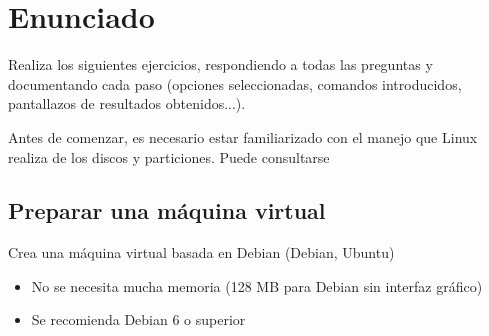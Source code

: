 
\usepackage{eurosym}




\renewcommand{\hmwkTitle}{Práctica RAID en Ubuntu}


\usepackage{blindtext}






\primerapagina

\setlength{\parindent}{2em}
\setlength{\parskip}{1em}


\section{Enunciado}
Realiza los siguientes ejercicios, respondiendo a todas las preguntas y documentando cada paso (opciones seleccionadas, comandos introducidos, pantallazos de resultados obtenidos...).

Antes de comenzar, es necesario estar familiarizado con el manejo que Linux realiza de los discos y particiones. Puede consultarse 

\subsection{Preparar una máquina virtual}
Crea una máquina virtual basada en Debian (Debian, Ubuntu)
\begin{itemize}
\item No se necesita mucha memoria (128 MB para Debian sin interfaz gráfico)
\item Se recomienda Debian 6 o superior
\end{itemize}

